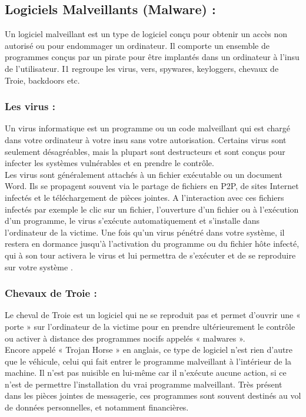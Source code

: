 \subsection{Logiciels Malveillants (Malware) :}
Un logiciel malveillant est un type de logiciel conçu pour obtenir un accès non autorisé ou pour endommager un ordinateur. Il comporte un ensemble de programmes conçus par un pirate pour être implantés dans un ordinateur à l’insu de l’utilisateur. I1 regroupe les virus, vers, spywares, keyloggers, chevaux de Troie, backdoors etc.
\subsubsection{Les virus : }
Un virus informatique est un programme ou un code malveillant qui est chargé dans votre ordinateur à votre insu sans votre autorisation. Certains virus sont seulement désagréables, mais la plupart sont destructeurs et sont conçus pour infecter les systèmes vulnérables et en prendre le contrôle.\\

Les virus sont généralement attachés à un fichier exécutable ou un document Word. Ils se propagent souvent via le partage de fichiers en P2P, de sites Internet infectés et le téléchargement
de pièces jointes. A l’interaction avec ces fichiers infectés par exemple le clic sur un fichier, l’ouverture d’un fichier ou à l’exécution d’un programme, le virus s’exécute automatiquement et s’installe dans l’ordinateur de la victime. Une fois qu’un virus pénétré dans votre système, il restera en dormance jusqu’à l’activation du programme ou du fichier hôte infecté, qui à son tour activera le virus et lui permettra de s’exécuter et de se reproduire sur votre système \cite{ref13}.
\subsubsection{Chevaux de Troie : }
Le cheval de Troie est un logiciel qui ne se reproduit pas et permet d’ouvrir une « porte » sur l’ordinateur de la victime pour en prendre ultérieurement le contrôle ou activer à distance des programmes nocifs appelés « malwares ».\\ 

Encore appelé « Trojan Horse » en anglais, ce type de logiciel n’est rien d’autre que le véhicule, celui qui fait entrer le programme malveillant à l’intérieur de la machine. Il n’est pas nuisible en lui-même car il n’exécute aucune action, si ce n’est de permettre l’installation du vrai programme malveillant.
Très présent dans les pièces jointes de messagerie, ces programmes sont souvent destinés au vol de données personnelles, et notamment financières.
